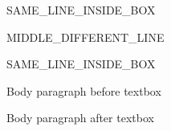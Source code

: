 \documentclass[11pt,a4paper]{article}
\begin{document}
SAME\_LINE\_INSIDE\_BOX

MIDDLE\_DIFFERENT\_LINE

SAME\_LINE\_INSIDE\_BOX

Body paragraph before textbox

Body paragraph after textbox
\end{document}
